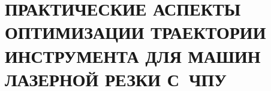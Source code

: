 
\chapter{
  ПРАКТИЧЕСКИЕ АСПЕКТЫ ОПТИМИЗАЦИИ ТРАЕКТОРИИ ИНСТРУМЕНТА
  ДЛЯ МАШИН ЛАЗЕРНОЙ РЕЗКИ С~ЧПУ
}
\setcounter{chapter}{2}
\setcounter{equation}{0}




